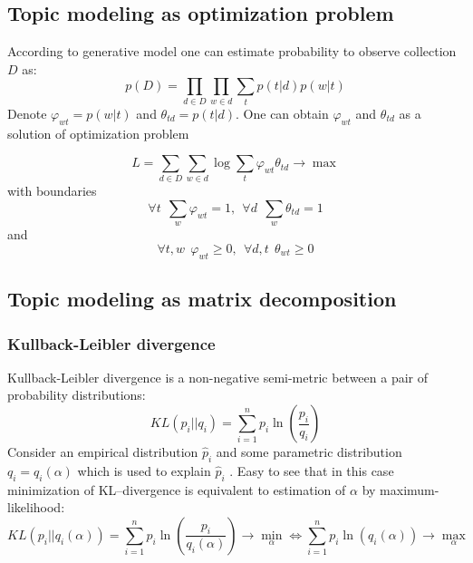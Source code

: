\subsection*{Topic modeling as optimization problem}
    According to generative model one can estimate probability to observe collection $D$ as:
    \begin{equation} p(D) = \prod_{d \in D} \prod_{w \in d} \sum_{t} p(t|d) p(w|t) \end{equation}
    Denote $\varphi_{wt} = p(w|t)$ and $\theta_{td} = p(t|d)$. One can obtain $\varphi_{wt}$
    and $\theta_{td}$ as a solution of optimization problem

    \begin{equation} \label{optimization} L = \sum_{d \in D} \sum_{w \in d} \log \sum_{t} \varphi_{wt} \theta_{td}  \to \max \end{equation}
	with boundaries
    \begin{equation} \forall t \ \ \sum_{w} \varphi_{wt} = 1, \ \ \forall d \ \ \sum_{w} \theta_{td} = 1 \end{equation}
    and
    \begin{equation} \forall t, w \ \  \varphi_{wt}  \geq 0, \ \ \forall d, t \ \ \theta_{wt}  \geq 0 \end{equation}

\subsection*{Topic modeling as matrix decomposition} \label{matrixDecomposition}

    \subsubsection*{Kullback-Leibler divergence}
	Kullback-Leibler divergence is a non-negative semi-metric between a pair of probability distributions:
	\begin{equation} KL(p_i||q_i) = \sum_{i=1}^n p_i \ln\left(\frac{p_i}{q_i}\right)  \end{equation}
	Consider an empirical distribution $\hat{p}_i$ and some parametric distribution $q_i = q_i(\alpha)$ which is used to explain $\hat{p}_i$ .
	Easy to see that in this case minimization of KL\---divergence is equivalent to estimation of $\alpha$ by maximum-likelihood:
	\begin{equation} KL(p_i||q_i(\alpha)) = \sum_{i=1}^n p_i \ln\left(\frac{p_i}{q_i(\alpha)}\right) \to \min_{\alpha}
	\Leftrightarrow \sum_{i=1}^n p_i \ln(q_i(\alpha)) \to \max_{\alpha} \end{equation}

